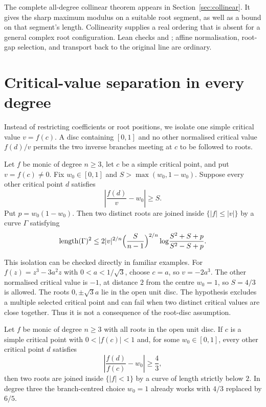 \documentclass[11pt]{article}
\begin{document}
The complete all-degree collinear theorem appears in
Section~\ref{sec:collinear}.  It gives the sharp maximum modulus on a suitable root segment, as well as
a bound on that segment's length. Collinearity supplies a real ordering
that is absent for a general complex root configuration.  Lean checks
and
; affine normalisation, root-gap
selection, and transport back to the original line are ordinary.

\section{Critical-value separation in every degree}
\label{sec:separation}

Instead of restricting coefficients or root positions, we isolate one
simple critical value $v=f(c)$. A disc containing $[0,1]$ and no other
normalised critical value $f(d)/v$ permits the two inverse branches
meeting at $c$ to be followed to roots.

\begin{theorem}
\label{res:critical-value-separation}
Let $f$ be monic of degree $n\ge3$, let $c$ be a simple critical point, and
put $v=f(c)\ne0$.  Fix $w_0\in[0,1]$ and
$S>\max(w_0,1-w_0)$.  Suppose every other critical point $d$ satisfies
\[
  \left|\frac{f(d)}v-w_0\right|\ge S .
\]
Put $p=w_0(1-w_0)$.  Then two distinct roots are joined inside
$\{|f|\le|v|\}$ by a curve $\Gamma$ satisfying
\begin{equation}\label{eq:disk-family-length}
 \operatorname{length}(\Gamma)^2
 \le 2|v|^{2/n}\Bigl(\frac{S}{n-1}\Bigr)^{2/n}
 \log\!\frac{S^2+S+p}{S^2-S+p}.
\end{equation}
\end{theorem}

This isolation can be checked directly in familiar examples. For
$f(z)=z^3-3a^2z$ with $0<a<1/\sqrt3$, choose $c=a$, so $v=-2a^3$.
The other normalised critical value is $-1$, at distance $2$ from the
centre $w_0=1$, so $S=4/3$ is allowed. The roots $0,\pm\sqrt3a$ lie in
the open unit disc. The hypothesis excludes a multiple selected critical
point and can fail when two distinct critical values are close together.
Thus it is not a consequence of the root-disc assumption.

\begin{corollary}
\label{res:critical-value-thresholds}
Let $f$ be monic of degree $n\ge3$ with all roots in the open unit disc.  If
$c$ is a simple critical point with $0<|f(c)|<1$ and, for some
$w_0\in[0,1]$, every other critical point $d$ satisfies
\[
 \left|\frac{f(d)}{f(c)}-w_0\right|\ge\frac43,
\]
then two roots are joined inside $\{|f|<1\}$ by a curve of length strictly
below $2$.  In degree three the branch-centred choice $w_0=1$ already works
with $4/3$ replaced by $6/5$.
\end{corollary}
\end{document}
